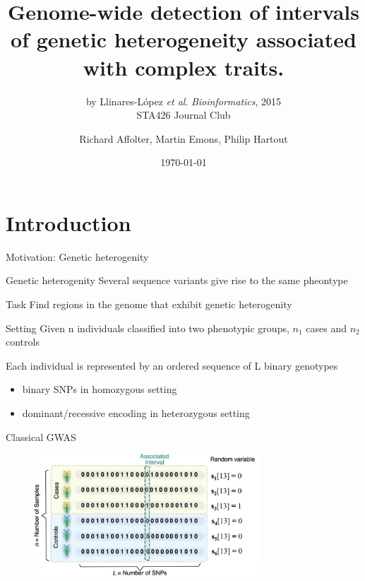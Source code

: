 \documentclass[aspectratio=32, 10pt]{beamer}
\title{Genome-wide detection of intervals of genetic heterogeneity associated with complex traits.}
\subtitle{by Llinares-López \emph{et al}. \textit{Bioinformatics}, 2015 \\ STA426 Journal Club}
\date{\today}
\author{Richard Affolter, Martin Emons, Philip Hartout}
\begin{document}
\maketitle


\section{Introduction}

\begin{frame}{Motivation: Genetic heterogenity}

\begin{block}{Genetic heterogenity}
\vspace{2pt}
Several sequence variants give rise to the same pheontype
\end{block}
\begin{block}{Task}
\vspace{2pt}
Find regions in the genome that exhibit genetic heterogenity
\end{block}
\begin{block}{Setting}
\vspace{2pt}
Given n individuals classified into two phenotypic groups, $n_1$ cases and $n_2$ controls

Each individual is represented by an ordered sequence of L binary genotypes
\begin{itemize}
  \item binary SNPs in homozygous setting
  \item dominant/recessive encoding in heterozygous setting
\end{itemize}
\end{block}

\end{frame}

\begin{frame}{Classical GWAS}

\begin{figure}
    \centering
    \includegraphics[width=0.75\textwidth]{figures/GWAS.png}
\end{figure}

\end{frame}
\end{document}
